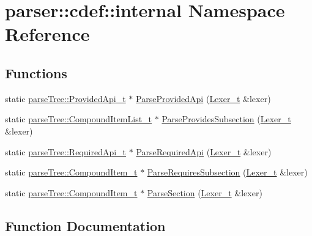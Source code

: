 \hypertarget{namespaceparser_1_1cdef_1_1internal}{}\section{parser\+:\+:cdef\+:\+:internal Namespace Reference}
\label{namespaceparser_1_1cdef_1_1internal}
\subsection*{Functions}
\begin{DoxyCompactItemize}
\item 
static \hyperlink{structparse_tree_1_1_provided_api__t}{parse\+Tree\+::\+Provided\+Api\+\_\+t} $\ast$ \hyperlink{namespaceparser_1_1cdef_1_1internal_a7c44a01e2d1f3c0bc6d7540e95da699f}{Parse\+Provided\+Api} (\hyperlink{classparser_1_1_lexer__t}{Lexer\+\_\+t} \&lexer)
\item 
static \hyperlink{structparse_tree_1_1_compound_item_list__t}{parse\+Tree\+::\+Compound\+Item\+List\+\_\+t} $\ast$ \hyperlink{namespaceparser_1_1cdef_1_1internal_a4b33803ea8b24a47b289a3e2805d8c8c}{Parse\+Provides\+Subsection} (\hyperlink{classparser_1_1_lexer__t}{Lexer\+\_\+t} \&lexer)
\item 
static \hyperlink{structparse_tree_1_1_required_api__t}{parse\+Tree\+::\+Required\+Api\+\_\+t} $\ast$ \hyperlink{namespaceparser_1_1cdef_1_1internal_aa84596503c465e2423ca8b2afdc646c6}{Parse\+Required\+Api} (\hyperlink{classparser_1_1_lexer__t}{Lexer\+\_\+t} \&lexer)
\item 
static \hyperlink{structparse_tree_1_1_compound_item__t}{parse\+Tree\+::\+Compound\+Item\+\_\+t} $\ast$ \hyperlink{namespaceparser_1_1cdef_1_1internal_a357ff365fd87fd577762a0292e978ad9}{Parse\+Requires\+Subsection} (\hyperlink{classparser_1_1_lexer__t}{Lexer\+\_\+t} \&lexer)
\item 
static \hyperlink{structparse_tree_1_1_compound_item__t}{parse\+Tree\+::\+Compound\+Item\+\_\+t} $\ast$ \hyperlink{namespaceparser_1_1cdef_1_1internal_af1012e2c68cdba26feb1587235288a64}{Parse\+Section} (\hyperlink{classparser_1_1_lexer__t}{Lexer\+\_\+t} \&lexer)
\end{DoxyCompactItemize}


\subsection{Function Documentation}
